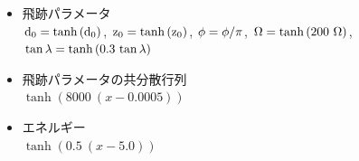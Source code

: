 \begin{itemize}
 \item 飛跡パラメータ\\
 ${\rm d_0} = \tanh{({\rm d_0})}$,
 ${\rm z_0} = \tanh{({\rm z_0})}$,
 ${\rm \phi} = {\rm \phi}/\pi$,
 ${\rm \Omega} = \tanh{(200\ {\rm \Omega})}$,
 ${\rm \tan{\lambda}} = \tanh{(0.3\ {\rm \tan{\lambda}})}$
 \item 飛跡パラメータの共分散行列\\
 $\tanh{(8000\ (x-0.0005))}$
 \item エネルギー\\
 $\tanh{(0.5\ (x-5.0))}$
\end{itemize}

